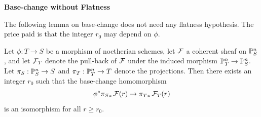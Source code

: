 

\centerline{\large\bf Base-change without Flatness}

\medskip

The following lemma on base-change does not need any flatness hypothesis.
The price paid is that the integer $r_0$ may depend on $\phi$.


\begin{lemma}\label{nhq-base-change-without-flatness}
Let $\phi : T\to S$ be a morphism of noetherian schemes,
let $\mathcal{F}$ a coherent sheaf on $\mathbb{P}^n_S$, and
let $\mathcal{F}_T$ denote the pull-back of
$\mathcal{F}$ under the induced morphism $\mathbb{P}^n_T\to \mathbb{P}^n_S$. Let
$\pi_S : \mathbb{P}^n_S \to S$ and $\pi_T : \mathbb{P}^n_T \to T$
denote the projections. Then there exists an integer
$r_0$ such that the base-change homomorphism
$$\phi^* {\pi_S}_*\, \mathcal{F}(r) \to {\pi_T}_* \, \mathcal{F}_T(r)$$
is an isomorphism for all $r\ge r_0$.
\end{lemma}



